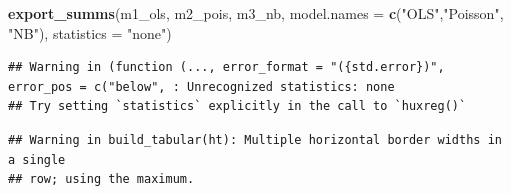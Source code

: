 \documentclass[
]{article}
\newenvironment{Shaded}{\begin{snugshade}}{\end{snugshade}}
\newcommand{\AttributeTok}[1]{\textcolor[rgb]{0.13,0.29,0.53}{#1}}
\newcommand{\FunctionTok}[1]{\textcolor[rgb]{0.13,0.29,0.53}{\textbf{#1}}}
\newcommand{\NormalTok}[1]{#1}
\newcommand{\StringTok}[1]{\textcolor[rgb]{0.31,0.60,0.02}{#1}}
\begin{document}
\begin{Shaded}
\begin{Highlighting}[]
\FunctionTok{export\_summs}\NormalTok{(m1\_ols, m2\_pois, m3\_nb,}
             \AttributeTok{model.names =} \FunctionTok{c}\NormalTok{(}\StringTok{"OLS"}\NormalTok{,}\StringTok{"Poisson"}\NormalTok{, }\StringTok{"NB"}\NormalTok{),}
             \AttributeTok{statistics =} \StringTok{"none"}\NormalTok{)}
\end{Highlighting}
\end{Shaded}

\begin{verbatim}
## Warning in (function (..., error_format = "({std.error})", error_pos = c("below", : Unrecognized statistics: none
## Try setting `statistics` explicitly in the call to `huxreg()`
\end{verbatim}

\begin{verbatim}
## Warning in build_tabular(ht): Multiple horizontal border widths in a single
## row; using the maximum.
\end{verbatim}

 
  \providecommand{\huxb}[2]{\arrayrulecolor[RGB]{#1}\global\arrayrulewidth=#2pt}
  \providecommand{\huxvb}[2]{\color[RGB]{#1}\vrule width #2pt}
  \providecommand{\huxtpad}[1]{\rule{0pt}{#1}}
  \providecommand{\huxbpad}[1]{\rule[-#1]{0pt}{#1}}
\end{document}
